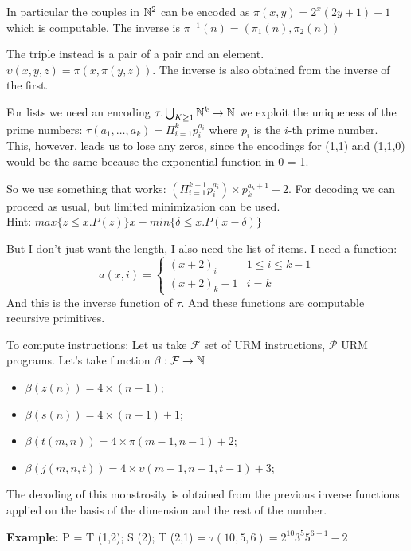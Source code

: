 In particular the couples in $ \mathbb{N}^2 $ can be encoded as
$ \pi(x,y) = 2^x(2y+1)-1 $ which is computable. The inverse is
$ \pi^{-1}(n) = (\pi_1(n), \pi_2(n)) $

The triple instead is a pair of a pair and an element.
$ \upsilon (x,y,z) = \pi (x, \pi(y,z))$. The inverse is also obtained
from the inverse of the first.

For lists we need an encoding
$ \tau . \bigcup_{K \geq 1} \mathbb{N}^k \rightarrow \mathbb{N} $ we exploit the
uniqueness of the prime numbers:
$ \tau(a_1,\dots,a_k) = \Pi_{i=1}^k p_i^{a_i}$ where $ p_i $ is the
$i$-th prime number. \\
This, however, leads us to lose any zeros, since
the encodings for (1,1) and (1,1,0) would be the same because the
exponential function in 0 = 1.

So we use something that works:
$ (\Pi_{i=1}^{k-1} p_i^{a_i}) \times p_k^{a_k+1} - 2$. For decoding we
can proceed as usual, but limited minimization can be used.\\ Hint:
$ max \{z \leq x . P(z)\} x - min\{\delta \leq x . P(x-\delta)\}$

But I don't just want the length, I also need the list of items. I
need a function:
\begin{equation*}
  a(x,i) = \begin{cases}
    (x+2)_i   & 1 \leq i \leq k-1 \\
    (x+2)_k-1 & i = k
  \end{cases}
\end{equation*}
And this is the inverse function of $\tau$. And these functions are
computable recursive primitives.

To compute instructions: Let us take $ \mathcal{F} $ set of URM
instructions, $ \mathcal{P} $ URM programs. Let's take function
$ \beta:\mathcal{F}\rightarrow\mathbb{N} $
\begin{itemize}
\item $ \beta(z(n)) = 4 \times (n-1) $;
\item $ \beta(s(n)) = 4 \times (n-1)+1 $;
\item $ \beta(t(m,n)) = 4 \times \pi(m-1,n-1)+2 $;
\item $ \beta(j(m,n,t)) = 4 \times \upsilon(m-1,n-1,t-1)+3 $;
\end{itemize}

The decoding of this monstrosity is obtained from the previous inverse
functions applied on the basis of the dimension and the rest of the
number.

\textbf{Example:} P = T (1,2); S (2); T (2,1) =
$ \tau(10,5,6) = 2^{10} 3^5 5^{6+1} -2 $

